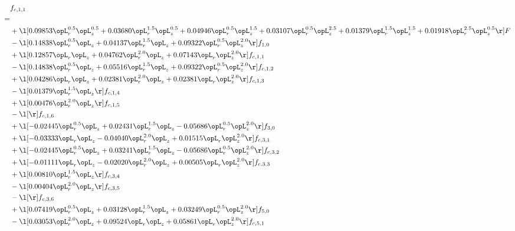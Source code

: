\begin{alignat}{2} 
\label{eq:f_11_1} 
& f_{c,1,1} \nonumber \\ 
 = \\ 
& + \l[  0.09853 \opL_r^{0.5} \opL_z^{0.5} +  0.03680 \opL_r^{1.5} \opL_z^{0.5} +  0.04946 \opL_r^{0.5} \opL_z^{1.5} +  0.03107 \opL_r^{0.5} \opL_z^{2.5} +  0.01379 \opL_r^{1.5} \opL_z^{1.5} +  0.01918 \opL_r^{2.5} \opL_z^{0.5}  \r] F \nonumber \\ 
& - \l[  0.14838 \opL_r^{0.5} \opL_z +  0.04137 \opL_r^{1.5} \opL_z +  0.09322 \opL_r^{0.5} \opL_z^{2.0}  \r] f_{1,0} \nonumber \\ 
& + \l[  0.12857 \opL_r \opL_z +  0.04762 \opL_r^{2.0} \opL_z +  0.07143 \opL_r \opL_z^{2.0}  \r] f_{c,1,1} \nonumber \\ 
& - \l[  0.14838 \opL_r^{0.5} \opL_z +  0.05516 \opL_r^{1.5} \opL_z +  0.09322 \opL_r^{0.5} \opL_z^{2.0}  \r] f_{c,1,2} \nonumber \\ 
& + \l[  0.04286 \opL_r \opL_z +  0.02381 \opL_r^{2.0} \opL_z +  0.02381 \opL_r \opL_z^{2.0}  \r] f_{c,1,3} \nonumber \\ 
& - \l[  0.01379 \opL_r^{1.5} \opL_z  \r] f_{c,1,4} \nonumber \\ 
& + \l[  0.00476 \opL_r^{2.0} \opL_z  \r] f_{c,1,5} \nonumber \\ 
& - \l[  \r] f_{c,1,6} \nonumber \\ 
& + \l[  -0.02445 \opL_r^{0.5} \opL_z +  0.02431 \opL_r^{1.5} \opL_z   -0.05686 \opL_r^{0.5} \opL_z^{2.0}  \r] f_{3,0} \nonumber \\ 
& + \l[  -0.03333 \opL_r \opL_z   -0.04040 \opL_r^{2.0} \opL_z +  0.01515 \opL_r \opL_z^{2.0}  \r] f_{c,3,1} \nonumber \\ 
& + \l[  -0.02445 \opL_r^{0.5} \opL_z +  0.03241 \opL_r^{1.5} \opL_z   -0.05686 \opL_r^{0.5} \opL_z^{2.0}  \r] f_{c,3,2} \nonumber \\ 
& + \l[  -0.01111 \opL_r \opL_z   -0.02020 \opL_r^{2.0} \opL_z +  0.00505 \opL_r \opL_z^{2.0}  \r] f_{c,3,3} \nonumber \\ 
& + \l[  0.00810 \opL_r^{1.5} \opL_z  \r] f_{c,3,4} \nonumber \\ 
& - \l[  0.00404 \opL_r^{2.0} \opL_z  \r] f_{c,3,5} \nonumber \\ 
& - \l[  \r] f_{c,3,6} \nonumber \\ 
& + \l[  0.07419 \opL_r^{0.5} \opL_z +  0.03128 \opL_r^{1.5} \opL_z +  0.03249 \opL_r^{0.5} \opL_z^{2.0}  \r] f_{5,0} \nonumber \\ 
& - \l[  0.03053 \opL_r^{2.0} \opL_z +  0.09524 \opL_r \opL_z +  0.05861 \opL_r \opL_z^{2.0}  \r] f_{c,5,1} \nonumber \\ 

\end{alignat}
